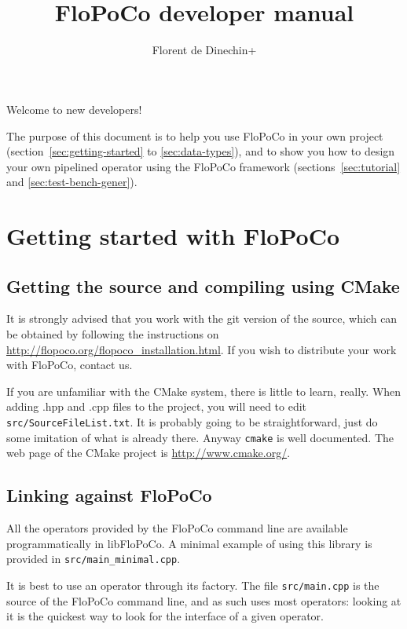 \documentclass{article}
\title{\scalebox{0.3}{\mbox{}}\\
FloPoCo  developer manual
}
\author{Florent de Dinechin+}
\begin{document}
 
\sloppy



\maketitle


Welcome to new developers! 

The purpose of this document is to help you use FloPoCo in your own
project (section~\ref{sec:getting-started} to \ref{sec:data-types}), and to show you how to design your own pipelined operator
using the FloPoCo framework (sections~\ref{sec:tutorial} and \ref{sec:test-bench-gener}). 

\tableofcontents

\section{Getting started with FloPoCo\label{sec:getting-started}}


\subsection{Getting the source and compiling using CMake}

It is strongly advised that you work with the git version of the source, which can be obtained by following the instructions on
\url{http://flopoco.org/flopoco_installation.html}. If you wish to distribute your work with FloPoCo, contact us.

If you are unfamiliar with the CMake system, there is little to learn,
really. When adding .hpp and .cpp files to the project, you will need
to edit \texttt{src/SourceFileList.txt}. It is probably going to be straightforward,
just do some imitation of what is already there. Anyway \texttt{cmake} is well
documented. The web page of the CMake project is \url{http://www.cmake.org/}.

\subsection{Linking against FloPoCo\label{sec:linking}}
All the operators provided by the FloPoCo command line are available
programmatically in libFloPoCo. A minimal example of using this
library is provided in \texttt{src/main\_minimal.cpp}.

It is best to use an operator through its factory. The file \texttt{src/main.cpp} is the source of the FloPoCo command
line, and as such uses most operators: looking at it is the quickest
way to look for the interface of a given operator.
\end{document}
